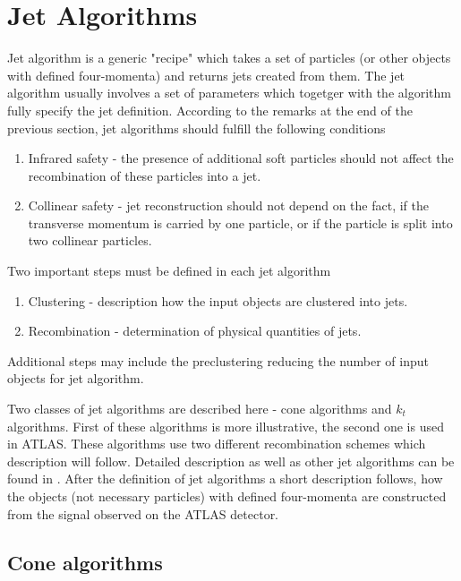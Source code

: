 \section{Jet Algorithms}

Jet algorithm is a generic "recipe" which takes a set of particles (or other
objects with defined four-momenta) and returns jets created from them. The jet
algorithm usually involves a set of parameters which togetger with the algorithm fully specify
the jet definition. According to the remarks at the end of the previous section,
jet algorithms should fulfill the following conditions 

\begin{enumerate}
  \item Infrared safety - the presence of additional soft particles should not
    affect the recombination of these particles into a jet.
  \item Collinear safety - jet reconstruction should not depend on the fact, if
    the transverse momentum is carried by one particle, or if the particle is split
    into two collinear particles.
\end{enumerate}
Two important steps must be defined in each jet algorithm

\begin{enumerate}
  \item Clustering - description how the input objects are clustered into jets.
  \item Recombination - determination of physical quantities of jets.
\end{enumerate}
Additional steps may include the preclustering reducing the number of input
objects for jet algorithm.

Two classes of jet algorithms are described here - cone algorithms and $k_t$
algorithms. First of these algorithms is more illustrative, the second one is
used in ATLAS. These algorithms use two different recombination schemes which
description will follow.  Detailed description as well as other jet algorithms
can be found in \cite{ATLASmain,JetDoporuceniZdenek}. After the definition of jet
algorithms a short description follows, how the objects (not necessary particles)
with defined four-momenta are constructed from the signal observed on the ATLAS
detector.

\subsection{Cone algorithms}

